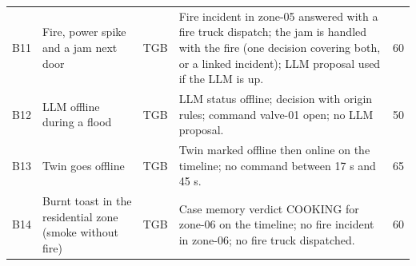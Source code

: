 \begin{table}[t]
\begin{tabular}{@{}l p{4.2cm} c p{9.3cm} r@{}}
B11 & Fire, power spike and a jam next door & TGB & Fire incident in zone-05 answered with a fire truck dispatch; the jam is handled with the fire (one decision covering both, or a linked incident); LLM proposal used if the LLM is up. & 60 \\
B12 & LLM offline during a flood & TGB & LLM status offline; decision with origin rules; command valve-01 open; no LLM proposal. & 50 \\
B13 & Twin goes offline & TGB & Twin marked offline then online on the timeline; no command between 17 s and 45 s. & 65 \\
B14 & Burnt toast in the residential zone (smoke without fire) & TGB & Case memory verdict COOKING for zone-06 on the timeline; no fire incident in zone-06; no fire truck dispatched. & 60 \\
\bottomrule
\end{tabular}
\par{}
\end{table}
